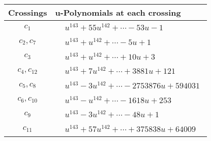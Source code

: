 \documentclass[1p]{elsarticle_modified}
\theoremstyle{definition}
\begin{document}
\begin{tabular}{m{50pt}|m{274pt}}
Crossings & \hspace{64pt}u-Polynomials at each crossing \\
\hline $$\begin{aligned}c_{1}\end{aligned}$$&$\begin{aligned}
&u^{143}+55 u^{142}+\cdots-53 u-1
\end{aligned}$\\
\hline $$\begin{aligned}c_{2},c_{7}\end{aligned}$$&$\begin{aligned}
&u^{143}+u^{142}+\cdots-5 u+1
\end{aligned}$\\
\hline $$\begin{aligned}c_{3}\end{aligned}$$&$\begin{aligned}
&u^{143}+u^{142}+\cdots+10 u+3
\end{aligned}$\\
\hline $$\begin{aligned}c_{4},c_{12}\end{aligned}$$&$\begin{aligned}
&u^{143}+7 u^{142}+\cdots+3881 u+121
\end{aligned}$\\
\hline $$\begin{aligned}c_{5},c_{8}\end{aligned}$$&$\begin{aligned}
&u^{143}-3 u^{142}+\cdots-2753876 u+594031
\end{aligned}$\\
\hline $$\begin{aligned}c_{6},c_{10}\end{aligned}$$&$\begin{aligned}
&u^{143}- u^{142}+\cdots-1618 u+253
\end{aligned}$\\
\hline $$\begin{aligned}c_{9}\end{aligned}$$&$\begin{aligned}
&u^{143}-3 u^{142}+\cdots-48 u+1
\end{aligned}$\\
\hline $$\begin{aligned}c_{11}\end{aligned}$$&$\begin{aligned}
&u^{143}+57 u^{142}+\cdots+375838 u+64009
\end{aligned}$\\
\hline
\end{tabular}\\~\\
\end{document}
